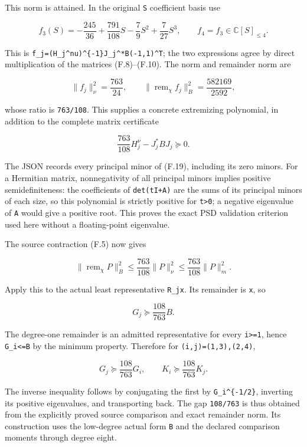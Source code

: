 This norm is attained. In the original \nolinkurl{S} coefficient basis use

\[
f_3(S)=-\frac{245}{36}+\frac{791}{108}S
                      -\frac79S^2+\frac7{27}S^3,
\qquad f_4=f_3\in\mathbb C[S]_{\le4}.
\tag{F.18}
\]

This is \texttt{f\_j=(H\_j\^{}nu)\^{}\{-1\}J\_j\^{}*B(-1,1)\^{}T}; the two expressions agree by direct multiplication of the matrices (F.8)--(F.10). The norm and remainder norm are

\[
\|f_j\|_\nu^2=\frac{763}{24},\qquad
\|\operatorname{rem}_\chi f_j\|_B^2=\frac{582169}{2592},
\]

whose ratio is \nolinkurl{763/108}. This supplies a concrete extremizing polynomial, in addition to the complete matrix certificate

\[
\frac{763}{108}H_j^\nu-J_j^*BJ_j\succeq0.
\tag{F.19}
\]

The JSON records every principal minor of (F.19), including its zero minors. For a Hermitian matrix, nonnegativity of all principal minors implies positive semidefiniteness: the coefficients of \nolinkurl{det(tI+A)} are the sums of its principal minors of each size, so this polynomial is strictly positive for \texttt{t\textgreater{}0}; a negative eigenvalue of \nolinkurl{A} would give a positive root. This proves the exact PSD validation criterion used here without a floating-point eigenvalue.

The source contraction (F.5) now gives

\[
\|\operatorname{rem}_\chi P\|_B^2
\le\frac{763}{108}\|P\|_\nu^2
\le\frac{763}{108}\|P\|_m^2.
\tag{F.20}
\]

Apply this to the actual least representative \nolinkurl{R_jx}. Its remainder is \nolinkurl{x}, so

\[
G_j\succeq\frac{108}{763}B.
\]

The degree-one remainder is an admitted representative for every \texttt{i\textgreater{}=1}, hence \texttt{G\_i\textless{}=B} by the minimum property. Therefore for \nolinkurl{(i,j)=(1,3),(2,4)},

\[
\boxed{G_j\succeq\frac{108}{763}G_i,
\qquad K_i\succeq\frac{108}{763}K_j.}
\tag{F.21}
\]

The inverse inequality follows by conjugating the first by \texttt{G\_i\^{}\{-1/2\}}, inverting its positive eigenvalues, and transporting back. The gap \nolinkurl{108/763} is thus obtained from the explicitly proved source comparison and exact remainder norm. Its construction uses the low-degree actual form \nolinkurl{B} and the declared comparison moments through degree eight.

